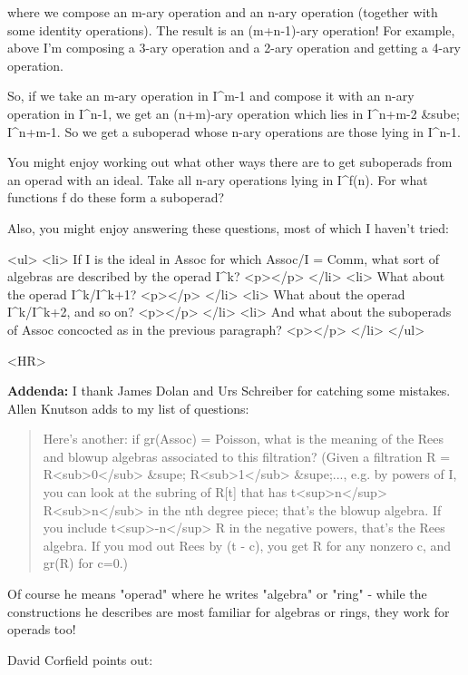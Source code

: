 where we compose an m-ary operation and an n-ary operation (together
with some identity operations).  The result is an (m+n-1)-ary operation!
For example, above I'm composing a 3-ary operation and a 2-ary operation
and getting a 4-ary operation.  

So, if we take an m-ary operation in I^{m-1} and compose it with an
n-ary operation in I^{n-1}, we get an (n+m)-ary operation which lies 
in I^{n+m-2} &sube; I^{n+m-1}.    So we get
a suboperad whose n-ary operations are those lying in I^{n-1}.

You might enjoy working out what other ways there are to get
suboperads from an operad with an ideal.  Take all n-ary operations
lying in I^{f(n)}.  For what functions f do these form a
suboperad?

Also, you might enjoy answering these questions, most of which
I haven't tried:

<ul>
<li>  If I is the ideal in
Assoc for which Assoc/I = Comm, what sort of algebras are described by
the operad I^{k}?  
<p></p>
</li>
<li>
What about the operad I^{k}/I^{k+1}?  
<p></p>
</li>
<li>
What about the operad I^{k}/I^{k+2}, and so on?  
<p></p>
</li>
<li>
And what about the
suboperads of Assoc concocted as in the previous paragraph?
<p></p>
</li>
</ul>

<HR>

\textbf{Addenda:} I thank James Dolan and Urs Schreiber for catching some 
mistakes.  Allen Knutson adds to my list of questions: 

\begin{quote}
   Here's another: if gr(Assoc) = Poisson, what is the meaning of 
   the Rees and blowup algebras associated to this filtration?
   (Given a filtration R = R<sub>0</sub> &supe; R<sub>1</sub>
   &supe;..., e.g. by powers of I, you can look at the subring of R[t]
   that has t<sup>n</sup> R<sub>n</sub> in the nth degree piece;
   that's the blowup algebra.  If you include t<sup>-n</sup> R in the negative
   powers, that's the Rees algebra. If you mod out Rees by (t - c),
   you get R for any nonzero c, and gr(R) for c=0.)
\end{quote}
    

Of course he means "operad" where he writes "algebra" or "ring" - while
the constructions he describes are most familiar for algebras or rings, 
they work for operads too!

David Corfield points out:




